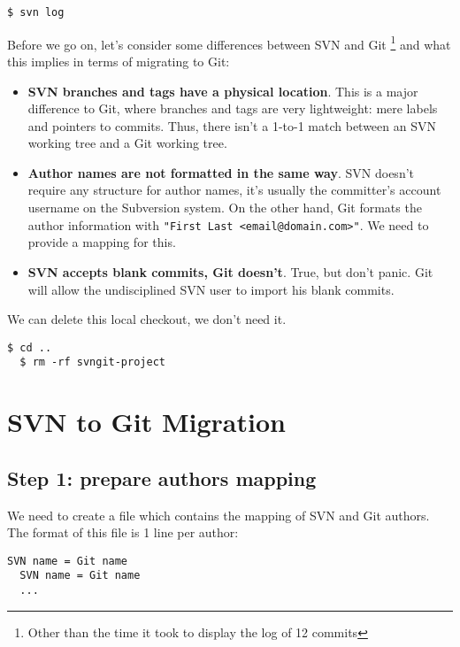 \documentclass{../common/tufte-latex/tufte-handout}
\begin{document}
\begin{lstlisting}[style=BashInputStyle]
  $ svn log
\end{lstlisting}

Before we go on, let's consider some differences between SVN and Git \footnote{Other than the time it took to display the log of 12 commits} and what this implies in terms of migrating to Git:

\begin{itemize}
 \item \textbf{SVN branches and tags have a physical location}. This is a major difference to Git, where branches and tags are very lightweight: mere labels and pointers to commits. Thus, there isn't a 1-to-1 match between an SVN working tree and a Git working tree.
 \item \textbf{Author names are not formatted in the same way}. SVN doesn't require any structure for author names, it's usually the committer's account username on the Subversion system. On the other hand, Git formats the author information with \texttt{"First Last <email@domain.com>"}. We need to provide a mapping for this.
 \item \textbf{SVN accepts blank commits, Git doesn't}. True, but don't panic. Git will allow the undisciplined SVN user to import his blank commits.
\end{itemize}

We can delete this local checkout, we don't need it.

\begin{lstlisting}[style=BashInputStyle]
  $ cd ..
  $ rm -rf svngit-project
\end{lstlisting}

\section{SVN to Git Migration}

\subsection{Step 1: prepare authors mapping}
We need to create a file which contains the mapping of SVN and Git authors.
The format of this file is 1 line per author:

\begin{lstlisting}[style=BashInputStyle]
  SVN name = Git name
  SVN name = Git name
  ...
\end{lstlisting}
\end{document}
